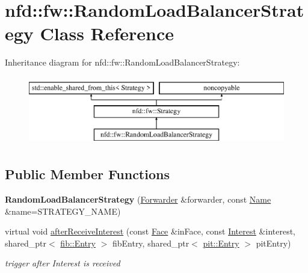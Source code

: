 \hypertarget{classnfd_1_1fw_1_1RandomLoadBalancerStrategy}{}\section{nfd\+:\+:fw\+:\+:Random\+Load\+Balancer\+Strategy Class Reference}
\label{classnfd_1_1fw_1_1RandomLoadBalancerStrategy}
Inheritance diagram for nfd\+:\+:fw\+:\+:Random\+Load\+Balancer\+Strategy\+:\begin{figure}[H]
\begin{center}
\leavevmode
\includegraphics[height=3.000000cm]{classnfd_1_1fw_1_1RandomLoadBalancerStrategy}
\end{center}
\end{figure}
\subsection*{Public Member Functions}
\begin{DoxyCompactItemize}
\item 
{\bfseries Random\+Load\+Balancer\+Strategy} (\hyperlink{classnfd_1_1Forwarder}{Forwarder} \&forwarder, const \hyperlink{classndn_1_1Name}{Name} \&name=S\+T\+R\+A\+T\+E\+G\+Y\+\_\+\+N\+A\+ME)\hypertarget{classnfd_1_1fw_1_1RandomLoadBalancerStrategy_a6a4624705f7afa2d17f1b97bb723ac3a}{}\label{classnfd_1_1fw_1_1RandomLoadBalancerStrategy_a6a4624705f7afa2d17f1b97bb723ac3a}

\item 
virtual void \hyperlink{classnfd_1_1fw_1_1RandomLoadBalancerStrategy_adedc4af590bd05f720a556e033ee2e45}{after\+Receive\+Interest} (const \hyperlink{classnfd_1_1Face}{Face} \&in\+Face, const \hyperlink{classndn_1_1Interest}{Interest} \&interest, shared\+\_\+ptr$<$ \hyperlink{classnfd_1_1fib_1_1Entry}{fib\+::\+Entry} $>$ fib\+Entry, shared\+\_\+ptr$<$ \hyperlink{classnfd_1_1pit_1_1Entry}{pit\+::\+Entry} $>$ pit\+Entry)
\begin{DoxyCompactList}\small\item\em trigger after Interest is received \end{DoxyCompactList}\end{DoxyCompactItemize}
